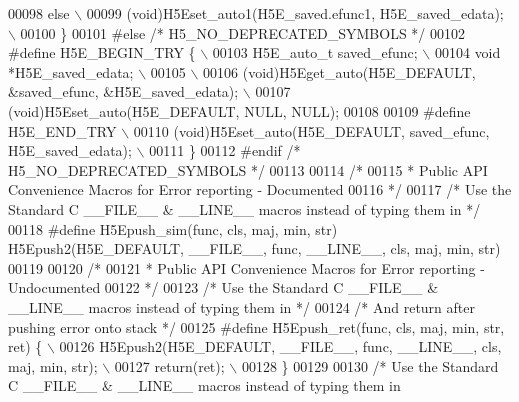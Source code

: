 \begin{DoxyCode}
00098 \textcolor{preprocessor}{    else                                      \(\backslash\)}
00099 \textcolor{preprocessor}{        (void)H5Eset\_auto1(H5E\_saved.efunc1, H5E\_saved\_edata);            \(\backslash\)}
00100 \textcolor{preprocessor}{\}}
00101 \textcolor{preprocessor}{#else }\textcolor{comment}{/* H5\_NO\_DEPRECATED\_SYMBOLS */}\textcolor{preprocessor}{}
00102 \textcolor{preprocessor}{#define H5E\_BEGIN\_TRY \{                               \(\backslash\)}
00103 \textcolor{preprocessor}{    H5E\_auto\_t saved\_efunc;                           \(\backslash\)}
00104 \textcolor{preprocessor}{    void *H5E\_saved\_edata;                            \(\backslash\)}
00105 \textcolor{preprocessor}{                                              \(\backslash\)}
00106 \textcolor{preprocessor}{    (void)H5Eget\_auto(H5E\_DEFAULT, &saved\_efunc, &H5E\_saved\_edata);       \(\backslash\)}
00107 \textcolor{preprocessor}{    (void)H5Eset\_auto(H5E\_DEFAULT, NULL, NULL);}
00108 
00109 \textcolor{preprocessor}{#define H5E\_END\_TRY                               \(\backslash\)}
00110 \textcolor{preprocessor}{    (void)H5Eset\_auto(H5E\_DEFAULT, saved\_efunc, H5E\_saved\_edata);         \(\backslash\)}
00111 \textcolor{preprocessor}{\}}
00112 \textcolor{preprocessor}{#endif }\textcolor{comment}{/* H5\_NO\_DEPRECATED\_SYMBOLS */}\textcolor{preprocessor}{}
00113 
00114 \textcolor{comment}{/*}
00115 \textcolor{comment}{ * Public API Convenience Macros for Error reporting - Documented}
00116 \textcolor{comment}{ */}
00117 \textcolor{comment}{/* Use the Standard C \_\_FILE\_\_ & \_\_LINE\_\_ macros instead of typing them in */}
00118 \textcolor{preprocessor}{#define H5Epush\_sim(func, cls, maj, min, str) H5Epush2(H5E\_DEFAULT, \_\_FILE\_\_, func, \_\_LINE\_\_, cls, maj,
       min, str)}
00119 
00120 \textcolor{comment}{/*}
00121 \textcolor{comment}{ * Public API Convenience Macros for Error reporting - Undocumented}
00122 \textcolor{comment}{ */}
00123 \textcolor{comment}{/* Use the Standard C \_\_FILE\_\_ & \_\_LINE\_\_ macros instead of typing them in */}
00124 \textcolor{comment}{/*  And return after pushing error onto stack */}
00125 \textcolor{preprocessor}{#define H5Epush\_ret(func, cls, maj, min, str, ret) \{                  \(\backslash\)}
00126 \textcolor{preprocessor}{    H5Epush2(H5E\_DEFAULT, \_\_FILE\_\_, func, \_\_LINE\_\_, cls, maj, min, str);      \(\backslash\)}
00127 \textcolor{preprocessor}{    return(ret);                                  \(\backslash\)}
00128 \textcolor{preprocessor}{\}}
00129 
00130 \textcolor{comment}{/* Use the Standard C \_\_FILE\_\_ & \_\_LINE\_\_ macros instead of typing them in}

\end{DoxyCode}
